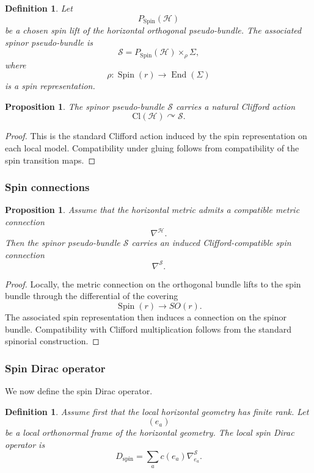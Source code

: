 \documentclass[11pt]{amsart}
\newtheorem{proposition}[theorem]{Proposition}
\newtheorem{definition}[theorem]{Definition}
\begin{document}
\begin{definition}
Let
\[
P_{\mathrm{Spin}}(\mathcal H)
\]
be a chosen spin lift of the horizontal orthogonal pseudo-bundle. The
associated spinor pseudo-bundle is
\[
\mathcal S
=
P_{\mathrm{Spin}}(\mathcal H)\times_\rho \Sigma,
\]
where
\[
\rho:\operatorname{Spin}(r)\to \operatorname{End}(\Sigma)
\]
is a spin representation.
\end{definition}

\begin{proposition}
The spinor pseudo-bundle \(\mathcal S\) carries a natural Clifford action
\[
\mathrm{Cl}(\mathcal H)\curvearrowright \mathcal S.
\]
\end{proposition}

\begin{proof}
This is the standard Clifford action induced by the spin representation on
each local model. Compatibility under gluing follows from compatibility of
the spin transition maps.
\end{proof}

\subsubsection{Spin connections}

\begin{proposition}
Assume that the horizontal metric admits a compatible metric connection
\[
\nabla^{\mathcal H}.
\]
Then the spinor pseudo-bundle \(\mathcal S\) carries an induced
Clifford-compatible spin connection
\[
\nabla^{\mathcal S}.
\]
\end{proposition}

\begin{proof}
Locally, the metric connection on the orthogonal bundle lifts to the spin
bundle through the differential of the covering
\[
\operatorname{Spin}(r)\to SO(r).
\]
The associated spin representation then induces a connection on the spinor
bundle. Compatibility with Clifford multiplication follows from the standard
spinorial construction.
\end{proof}

\subsubsection{Spin Dirac operator}

We now define the spin Dirac operator.

\begin{definition}
Assume first that the local horizontal geometry has finite rank. Let
\[
(e_a)
\]
be a local orthonormal frame of the horizontal geometry. The local spin Dirac
operator is
\[
D_{\mathrm{spin}}
=
\sum_a c(e_a)\nabla^{\mathcal S}_{e_a}.
\]
\end{definition}
\end{document}
